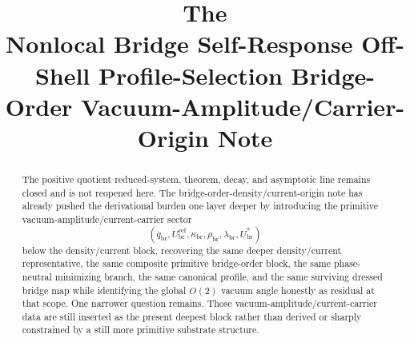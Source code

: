 \documentclass[11pt]{article}
\title{\textbf{The \TheoryName{}}\\[0.4em]
\large Nonlocal Bridge Self-Response Off-Shell Profile-Selection Bridge-Order Vacuum-Amplitude/Carrier-Origin Note}
\author{}
\date{}
\newcommand{\RespVacRef}{U_{\mathrm{br}}^{\mathrm{ref}}}
\newcommand{\RespVacEq}{U_{\mathrm{br}}^{\ast}}
\newcommand{\RespVacReadout}{q_{\mathrm{br}}}
\newcommand{\RespVacCov}{\kappa_{\mathrm{br}}}
\newcommand{\RespVacRelax}{\rho_{\mathrm{br}}}
\newcommand{\RespVacWell}{\lambda_{\mathrm{br}}}
\begin{document}
\maketitle

\begin{abstract}
The positive quotient reduced-system, theorem, decay, and asymptotic line remains closed and is not reopened here. The bridge-order-density/current-origin note has already pushed the derivational burden one layer deeper by introducing the primitive vacuum-amplitude/current-carrier sector
\[
(\RespVacReadout,\RespVacRef,\RespVacCov,\RespVacRelax,\RespVacWell,\RespVacEq)
\]
below the density/current block, recovering the same deeper density/current representative, the same composite primitive bridge-order block, the same phase-neutral minimizing branch, the same canonical profile, and the same surviving dressed bridge map while identifying the global \(O(2)\) vacuum angle honestly as residual at that scope. One narrower question remains. Those vacuum-amplitude/current-carrier data are still inserted as the present deepest block rather than derived or sharply constrained by a still more primitive substrate structure.


\end{abstract}
\end{document}
